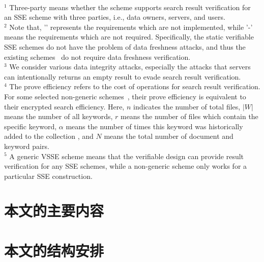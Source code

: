 \begin{table*}[t]
\begin{center}
\begin{tabular}{|c|c|c|c|c|c|c|c}
    \hline
  \end{tabular}\\
  \end{center}
  $^1$ Three-party means whether the scheme supports search result verification for an SSE scheme with three parties, i.e., data owners, servers, and users.\\
  $^2$ Note that, '\texttimes' represents the requirements which are not implemented, while '-' means the requirements which are not required. Specifically, the static verifiable SSE schemes do not have the problem of data freshness attacks, and thus the existing schemes~\cite{kurosawa2012uc,chai2012verifiable,cheng2015verifiable,ogataefficient} do not require data freshness verification.\\
  $^3$ We consider various data integrity attacks, especially the attacks that servers can intentionally returns an empty result to evade search result verification.\\
  $^4$ The prove efficiency refers to the cost of operations for search result verification. For some selected non-generic schemes~\cite{kurosawa2012uc,chai2012verifiable,kurosawa2013update,stefanov2014practical,cheng2015verifiable}, their prove efficiency is equivalent to their encrypted search efficiency. Here, $n$ indicates the number of total files, $|W|$ means the number of all keywords, $r$ means the number of files which contain the specific keyword, $\alpha$ means the number of times this keyword was historically added to the collection \cite{stefanov2014practical}, and $N$ means the total number of document and keyword pairs.\\
  $^5$ A generic VSSE scheme means that the verifiable design can provide result verification for any SSE schemes, while a non-generic scheme only works for a particular SSE construction.\\
\end{table*}




\section{本文的主要内容}

\section{本文的结构安排}
